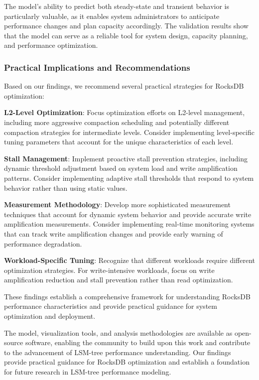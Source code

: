 \documentclass[11pt]{article}
\begin{document}
The model's ability to predict both steady-state and transient behavior is particularly valuable, as it enables system administrators to anticipate performance changes and plan capacity accordingly. The validation results show that the model can serve as a reliable tool for system design, capacity planning, and performance optimization.

\subsubsection{Practical Implications and Recommendations}

Based on our findings, we recommend several practical strategies for RocksDB optimization:

\textbf{L2-Level Optimization}: Focus optimization efforts on L2-level management, including more aggressive compaction scheduling and potentially different compaction strategies for intermediate levels. Consider implementing level-specific tuning parameters that account for the unique characteristics of each level.

\textbf{Stall Management}: Implement proactive stall prevention strategies, including dynamic threshold adjustment based on system load and write amplification patterns. Consider implementing adaptive stall thresholds that respond to system behavior rather than using static values.

\textbf{Measurement Methodology}: Develop more sophisticated measurement techniques that account for dynamic system behavior and provide accurate write amplification measurements. Consider implementing real-time monitoring systems that can track write amplification changes and provide early warning of performance degradation.

\textbf{Workload-Specific Tuning}: Recognize that different workloads require different optimization strategies. For write-intensive workloads, focus on write amplification reduction and stall prevention rather than read optimization.

These findings establish a comprehensive framework for understanding RocksDB performance characteristics and provide practical guidance for system optimization and deployment.

The model, visualization tools, and analysis methodologies are available as open-source software, enabling the community to build upon this work and contribute to the advancement of LSM-tree performance understanding. Our findings provide practical guidance for RocksDB optimization and establish a foundation for future research in LSM-tree performance modeling.
\end{document}
